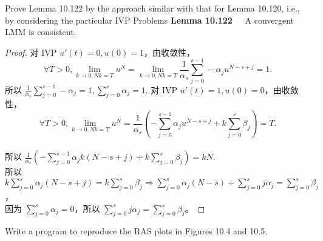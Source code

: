 \documentclass[lang=cn,a4paper,newtx,bibend=bibtex]{elegantpaper}
\begin{document}
\begin{prob}[Exercise 10.123]
  Prove Lemma 10.122 by the approach similar with that for 
  Lemma 10.120, i.e., by considering the particular IVP Problems
  \textbf{Lemma 10.122~~} A convergent LMM is consistent.
\end{prob}

\begin{proof}
  对 IVP \(u'(t) = 0, u(0) = 1\)，由收敛性，\[\forall T > 0, \lim_{k \to 0, Nk = T} u^N = \lim_{k \to 0, Nk = T} \frac{1}{\alpha_s} \sum\limits_{j = 0}^{s-1} -\alpha_j u^{N-s+j} = 1.\]
  所以 \(\frac{1}{\alpha_s} \sum\limits_{j = 0}^{s-1} -\alpha_j = 1, \sum\limits_{j = 0}^s \alpha_j = 1\).
  对 IVP \(u'(t) = 1, u(0) = 0\)，由收敛性，\[\forall T > 0, \lim_{k \to 0, Nk = T} u^N = \frac{1}{\alpha_s} \left(-\sum\limits_{j=0}^{s-1} \alpha_j u^{N-s+j} + k\sum\limits_{j=0}^s \beta_j \right) = T.\]\\
  所以 $\frac{1}{\alpha_s} \left(-\sum\limits_{j=0}^{s-1} \alpha_j k (N-s + j) + k\sum\limits_{j=0}^s \beta_j\right) = kN $. \\
  所以 $k\sum\limits_{j=0}^s \alpha_j (N-s+j) = k\sum\limits_{j=0}^s \beta_j \Rightarrow \sum\limits_{j=0}^s \alpha_j (N-s) + \sum\limits_{j=0}^s j\alpha_j = \sum\limits_{j=0}^s \beta_j$，\\
  因为 $\sum\limits_{j=0}^s \alpha_j =0$，所以 $\sum\limits_{j=0}^s j\alpha_j = \sum\limits_{j=0}^s \beta_j$。
\end{proof}


\begin{prob}[Exercise 10.138]
  Write a program to reproduce the RAS plots in Figures 10.4
  and 10.5.
\end{prob}
\end{document}
